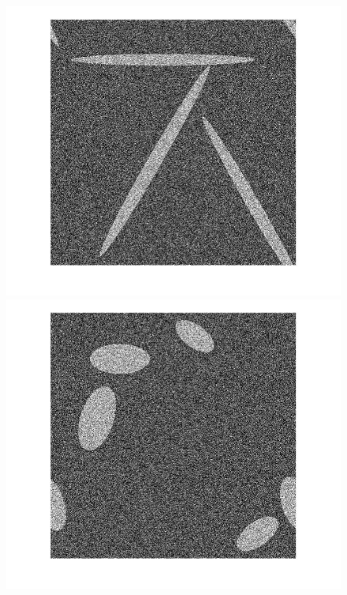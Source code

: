 \documentclass[journal]{IEEEtran}
\begin{document}
\begin{figure}[htb!]
\centering
\includegraphics[scale=.11]{../../figs/ellipses_t1}
\includegraphics[scale=.11]{../../figs/ellipses_t2}

\end{figure}
\end{document}
